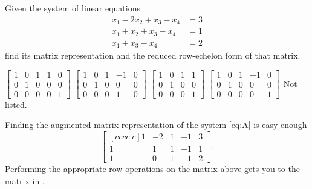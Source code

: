 \begin{questions}
  \question[10] Given the system of linear equations
  \[
    \label{eq:A}
    \tag{$\bigstar$}
    \begin{aligned}
      x_1-2x_2+x_3-x_4&=3\\
      x_1+x_2+x_3-x_4&=1\\
      x_1+x_3-x_4&=2
    \end{aligned}
  \]
    find its matrix representation and the reduced row-echelon form of that
    matrix.
  \begin{choices}
    \choice $\left[
      \begin{smallmatrix}
        1&0&1&1&0\\0&1&0&0&0\\0&0&0&0&1
      \end{smallmatrix}
    \right]$%
    \choice $\left[
      \begin{smallmatrix}
        1&0&1&-1&0\\0&1&0&0&0\\0&0&0&1&0
      \end{smallmatrix}
    \right]$%
    \choice $\left[
      \begin{smallmatrix}
        1&0&1&1\\0&1&0&0\\0&0&0&1
      \end{smallmatrix}
    \right]$%
    \CorrectChoice $\left[
      \begin{smallmatrix}
        1&0&1&-1&0\\0&1&0&0&0\\0&0&0&0&1
      \end{smallmatrix}
    \right]$%
    \choice Not listed.
  \end{choices}
  \begin{solution}
    Finding the augmented matrix representation of the system \eqref{eq:A}
    is easy enough
    \[
      \begin{bmatrix}[cccc|c]
        1&-2&1&-1&3\\
        1&1&1&-1&1\\
        1&0&1&-1&2
      \end{bmatrix}.
    \]
    Performing the appropriate row operations on the matrix above gets you
    to the matrix in .
  \end{solution}


\end{questions}
